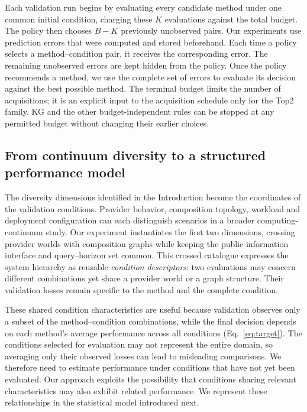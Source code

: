 \documentclass[10pt,a4paper]{article}
\begin{document}
Each validation run begins by evaluating every candidate method under one common initial condition, charging these $K$ evaluations against the total budget. The policy then chooses $B-K$ previously unobserved pairs. Our experiments use prediction errors that were computed and stored beforehand. Each time a policy selects a method--condition pair, it receives the corresponding error. The remaining unobserved errors are kept hidden from the policy. Once the policy recommends a method, we use the complete set of errors to evaluate its decision against the best possible method. The terminal budget limits the number of acquisitions; it is an explicit input to the acquisition schedule only for the Top2 family. KG and the other budget-independent rules can be stopped at any permitted budget without changing their earlier choices.

\subsection{From continuum diversity to a structured performance model}
\label{sec:performance-model}
The diversity dimensions identified in the Introduction become the coordinates of the validation conditions. Provider behavior, composition topology, workload and deployment configuration can each distinguish scenarios in a broader computing-continuum study. Our experiment instantiates the first two dimensions, crossing provider worlds with composition graphs while keeping the public-information interface and query--horizon set common. This crossed catalogue expresses the system hierarchy as reusable \emph{condition descriptors}: two evaluations may concern different combinations yet share a provider world or a graph structure. Their validation losses remain specific to the method and the complete condition.

These shared condition characteristics are useful because validation observes only a subset of the method--condition combinations, while the final decision depends on each method's average performance across all conditions (Eq.~\eqref{eq:target}). The conditions selected for evaluation may not represent the entire domain, so averaging only their observed losses can lead to misleading comparisons. We therefore need to estimate performance under conditions that have not yet been evaluated. Our approach exploits the possibility that conditions sharing relevant characteristics may also exhibit related performance. We represent these relationships in the statistical model introduced next.
\end{document}

